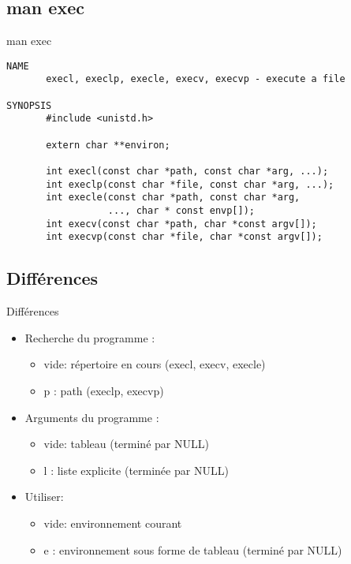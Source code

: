 \begin{frame}[containsverbatim]{\sectitle}
\def\subsectitle{man exec}
\subsection{\subsectitle}
\begin{block}{\subsectitle}
\begin{verbatim}
NAME
       execl, execlp, execle, execv, execvp - execute a file

SYNOPSIS
       #include <unistd.h>

       extern char **environ;

       int execl(const char *path, const char *arg, ...);
       int execlp(const char *file, const char *arg, ...);
       int execle(const char *path, const char *arg,
                  ..., char * const envp[]);
       int execv(const char *path, char *const argv[]);
       int execvp(const char *file, char *const argv[]);
\end{verbatim}
\end{block}
\end{frame}

\begin{frame}{\sectitle}
\def\subsectitle{Différences}
\subsection{\subsectitle}
\begin{block}{\subsectitle}
\begin{itemize}
    \item Recherche du programme : 
    \begin{itemize}
        \item vide: répertoire en cours (execl, execv, execle)
        \item p : path (execlp, execvp)
    \end{itemize}
    \item Arguments du programme :
    \begin{itemize}
        \item vide: tableau (terminé par NULL)
        \item l : liste explicite (terminée par NULL)
    \end{itemize}
    \item Utiliser:
    \begin{itemize}
        \item vide: environnement courant
        \item e : environnement sous forme de tableau (terminé par NULL)
    \end{itemize}
\end{itemize}
\end{block}
\end{frame}

